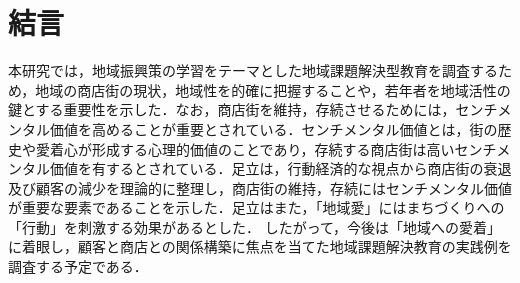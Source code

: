 \section{結言}

本研究では，地域振興策の学習をテーマとした地域課題解決型教育を調査するため，地域の商店街の現状，地域性を的確に把握することや，若年者を地域活性の鍵とする重要性を示した．なお，商店街を維持，存続させるためには，センチメンタル価値を高めることが重要とされている．センチメンタル価値とは，街の歴史や愛着心が形成する心理的価値のことであり，存続する商店街は高いセンチメンタル価値を有するとされている\cite{足立基浩2015}．足立は，行動経済的な視点から商店街の衰退及び顧客の減少を理論的に整理し，商店街の維持，存続にはセンチメンタル価値が重要な要素であることを示した．足立はまた，「地域愛」にはまちづくりへの「行動」を刺激する効果があるとした．%
したがって，今後は「地域への愛着」に着眼し，顧客と商店との関係構築に焦点を当てた地域課題解決教育の実践例を調査する予定である．
